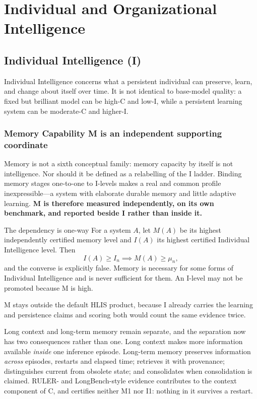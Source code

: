 \documentclass[11pt]{article}
\theoremstyle{definition}
\begin{document}
\section{Individual and Organizational Intelligence}

\subsection{Individual Intelligence (I)}\label{sec:memory}

Individual Intelligence concerns what a persistent individual can preserve, learn, and change about itself over time. It is not identical to base-model quality: a fixed but brilliant model can be high-C and low-I, while a persistent learning system can be moderate-C and higher-I.

\subsubsection{Memory Capability M is an independent supporting coordinate}

Memory is not a sixth conceptual family: memory capacity by itself is not intelligence. Nor should it be defined as a relabelling of the I ladder. Binding memory stages one-to-one to I-levels makes a real and common profile inexpressible---a system with elaborate durable memory and little adaptive learning. \textbf{M is therefore measured independently, on its own benchmark, and reported beside I rather than inside it.}

\begin{claimbox}{The dependency is one-way}
For a system $A$, let $M(A)$ be its highest independently certified memory level and $I(A)$ its highest certified Individual Intelligence level. Then
\[ I(A) \ge I_n \implies M(A) \ge \mu_n, \]
and the converse is explicitly false. Memory is necessary for some forms of Individual Intelligence and is never sufficient for them. An I-level may not be promoted because M is high.

M stays outside the default HLIS product, because I already carries the learning and persistence claims and scoring both would count the same evidence twice.
\end{claimbox}

Long context and long-term memory remain separate, and the separation now has two consequences rather than one. Long context makes more information available \emph{inside} one inference episode. Long-term memory preserves information \emph{across} episodes, restarts and elapsed time; retrieves it with provenance; distinguishes current from obsolete state; and consolidates when consolidation is claimed. RULER- and LongBench-style evidence contributes to the context component of C, and certifies neither M1 nor I1: nothing in it survives a restart.
\end{document}
